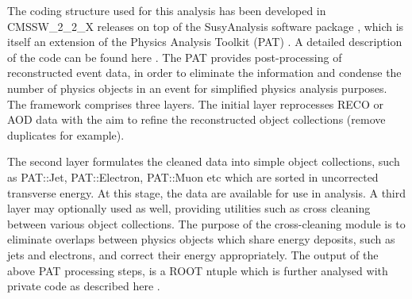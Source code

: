 The coding structure used for this analysis has been developed in CMSSW\_2\_2\_X releases on top of the SusyAnalysis software package \cite{susypat1}, which is itself an extension of the Physics Analysis Toolkit (PAT) \cite{susypat2}. A detailed description of the code can be found here \cite{susypat}. The PAT provides post-processing of reconstructed event data, in order to eliminate the information and condense the number of physics objects in an event for simplified physics analysis purposes. The framework comprises three layers. The initial layer reprocesses RECO or AOD data with the aim to refine the reconstructed object collections (remove duplicates for example).

The second layer formulates the cleaned data into simple object collections, such as PAT::Jet, PAT::Electron, PAT::Muon etc which are sorted in uncorrected transverse energy.  At this stage, the data are available for use in analysis. A third layer may optionally used as well, providing utilities such as cross cleaning between various object collections. The purpose of the cross-cleaning module is to eliminate overlaps between physics objects which share energy deposits, such as jets and electrons, and correct their energy appropriately. The output of the above PAT processing steps, is a ROOT ntuple which is further analysed with private code as described here \cite{ICNT}.